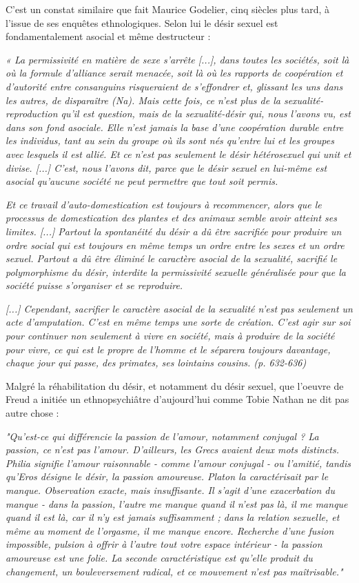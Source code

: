  C'est un constat similaire que fait Maurice Godelier, cinq siècles plus tard, à l'issue de ses enquêtes ethnologiques. Selon lui le désir sexuel est fondamentalement asocial et même destructeur : 
 \begin{displayquote}
 \emph{« La permissivité en matière de sexe s'arrête [...], dans toutes les sociétés, soit là où la formule d'alliance serait menacée, soit là où les rapports de coopération et d'autorité entre consanguins risqueraient de s'effondrer et, glissant les uns dans les autres, de disparaître (Na). Mais cette fois, ce n'est plus de la sexualité-reproduction qu'il est question, mais de la sexualité-désir qui, nous l'avons vu, est dans son fond asociale. Elle n'est jamais la base d'une coopération durable entre les individus, tant au sein du groupe où ils sont nés qu'entre lui et les groupes avec lesquels il est allié. Et ce n'est pas seulement le désir hétérosexuel qui unit et divise. [...] C'est, nous l'avons dit, parce que le désir sexuel en lui-même est asocial qu'aucune société ne peut permettre que tout soit permis.} 
 
 \emph{Et ce travail d'auto-domestication est toujours à recommencer, alors que le processus de domestication des plantes et des animaux semble avoir atteint ses limites. [...] Partout la spontanéité du désir a dû être sacrifiée pour produire un ordre social qui est toujours en même temps un ordre entre les sexes et un ordre sexuel. Partout a dû être éliminé le caractère asocial de la sexualité, sacrifié le polymorphisme du désir, interdite la permissivité sexuelle généralisée pour que la société puisse s'organiser et se reproduire.}
 
\emph{[...] Cependant, sacrifier le caractère asocial de la sexualité n'est pas seulement un acte d'amputation.  C'est en même temps une sorte de création. C'est agir sur soi pour continuer non seulement à vivre en société, mais à produire de la société pour vivre, ce qui est le propre de l'homme et le séparera toujours davantage, chaque jour qui passe, des primates, ses lointains cousins. (p. 632-636)}
\end{displayquote}
Malgré la réhabilitation du désir, et notamment du désir sexuel, que l’oeuvre de Freud a initiée un ethnopsychiâtre d'aujourd'hui comme Tobie Nathan ne dit pas autre chose : 
\begin{displayquote}
\emph{"Qu'est-ce qui différencie la passion de l'amour, notamment conjugal ? La passion, ce n'est pas l'amour. D'ailleurs, les Grecs avaient deux mots distincts. Philia signifie l'amour raisonnable - comme l'amour conjugal - ou l'amitié, tandis qu'Eros désigne le désir, la passion amoureuse. Platon la caractérisait par le manque. Observation exacte, mais insuffisante. Il s'agit d'une exacerbation du manque - dans la passion, l'autre me manque quand il n'est pas là, il me manque quand il est là, car il n'y est jamais suffisamment ; dans la relation sexuelle, et même au moment de l'orgasme, il me manque encore. Recherche d'une fusion impossible, pulsion à offrir à l'autre tout votre espace intérieur - la passion amoureuse est une folie. La seconde caractéristique est qu'elle produit du changement, un bouleversement radical, et ce mouvement n'est pas maîtrisable."}
\end{displayquote}
